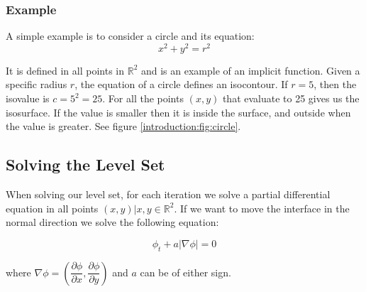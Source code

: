 

\subsubsection{Example}

A simple example is to consider a circle and its equation:
\begin{equation*}
  x^{2} + y^{2} = r^{2}
\end{equation*}

It is defined in all points in $\mathbb{R}^{2}$ and is an example of an implicit function. Given a specific radius $r$, the equation of a circle defines an isocontour. If $r = 5$, then the isovalue is $c = 5^{2} = 25$. For all the points $(x,y)$ that evaluate to 25 gives us the isosurface. If the value is smaller then it is inside the surface, and outside when the value is greater. See figure \vref{introduction:fig:circle}.




\subsection{Solving the Level Set}

When solving our level set, for each iteration we solve a partial differential equation in all points $(x,y) | x,y \in \mathbb{R}^{2}$. If we want to move the interface in the normal direction we solve the following equation:

\begin{equation}
\label{introduction:eq:levelsetndirection}
  \phi_{t} + a|\nabla \phi| = 0
\end{equation}

where $\nabla \phi = (\dfrac{\partial \phi}{\partial x}, \dfrac{\partial \phi}{\partial y})$  and $a$ can be of either sign. 

